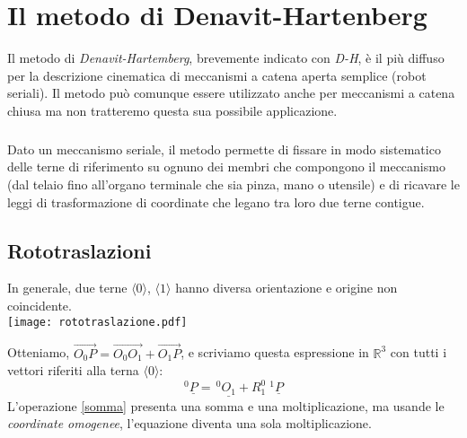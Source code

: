 \chapter{Il metodo di Denavit-Hartenberg}
Il metodo di \emph{Denavit-Hartemberg}, brevemente indicato con \emph{D-H}, è il più diffuso per la descrizione cinematica di meccanismi a catena aperta semplice (robot seriali). Il metodo può comunque essere utilizzato anche per meccanismi a catena chiusa ma non tratteremo questa sua possibile applicazione.

\paragraph{}
Dato un meccanismo seriale, il metodo permette di fissare in modo sistematico delle terne di riferimento su ognuno dei membri che compongono il meccanismo (dal telaio fino all’organo terminale che sia  pinza, mano o utensile) e di ricavare le leggi di trasformazione di coordinate che legano tra loro due terne contigue.

\section{Rototraslazioni}
In generale, due terne $\langle0\rangle$, $\langle1\rangle$ hanno diversa orientazione e origine non coincidente.\\
\texttt{[image: rototraslazione.pdf]}

Otteniamo, $\vec{O_{0}P} = \vec{O_0O_1} + \vec{O_1P}$, e scriviamo questa espressione in $\mathbb{R}^3$ con tutti i vettori riferiti alla terna $\langle0\rangle$: 
\begin{equation} \label{somma}
	^0\underline{P} = \,^0\underline{O_1} + R_1^0 \; ^1\underline{P} 
\end{equation}
L'operazione \eqref{somma} presenta una somma e una moltiplicazione, ma usande le \emph{coordinate omogenee}, l'equazione diventa una sola moltiplicazione.

